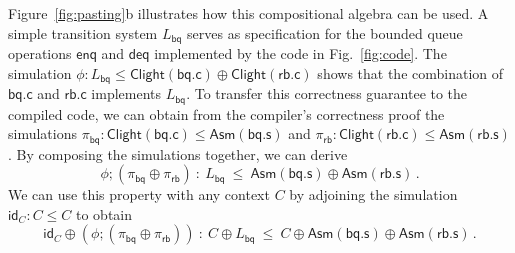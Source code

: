 \documentclass[acmsmall,screen,review,anonymous]{acmart}
\newcommand{\kw}[1]{\ensuremath{ \mathsf{#1} }}
\begin{document}

\begin{example} \label{ex:compcomp} %
Figure~\ref{fig:pasting}b
illustrates how this compositional algebra can be used.
A simple transition system $L_\kw{bq}$ serves as specification
for the bounded queue operations $\kw{enq}$ and $\kw{deq}$
implemented by the code in Fig.~\ref{fig:code}.
The simulation
$
  \phi : L_\kw{bq}
    \le \kw{Clight}(\kw{bq.c}) \oplus \kw{Clight}(\kw{rb.c})
$
shows that the combination of $\kw{bq.c}$ and $\kw{rb.c}$
implements $L_\kw{bq}$.
To transfer this correctness guarantee to the compiled code,
we can obtain from the compiler's correctness proof the simulations
$\pi_\kw{bq} : \kw{Clight}(\kw{bq.c}) \le \kw{Asm}(\kw{bq.s})$ and
$\pi_\kw{rb} : \kw{Clight}(\kw{rb.c}) \le \kw{Asm}(\kw{rb.s})$.
By composing the simulations together,
we can derive
\begin{equation}
  \phi \mathbin; (\pi_\kw{bq} \oplus \pi_\kw{rb}) \::\:
  L_\kw{bq} \:\le\:
  \kw{Asm}(\kw{bq.s}) \oplus \kw{Asm}(\kw{rb.s})
  \,.
  \label{eqn:cex}
\end{equation}
We can use this property with any context $C$
by adjoining
the simulation $\kw{id}_C : C \le C$
to obtain
\begin{equation}
  \kw{id}_C \oplus (\phi \mathbin; (\pi_\kw{bq} \oplus \pi_\kw{rb}))
  \::\:
  C \oplus L_\kw{bq}
  \:\le\:
  C \oplus \kw{Asm}(\kw{bq.s}) \oplus \kw{Asm}(\kw{rb.s})
  \,.
  \label{eqn:ccex}
\end{equation}
\end{example}
\end{document}
